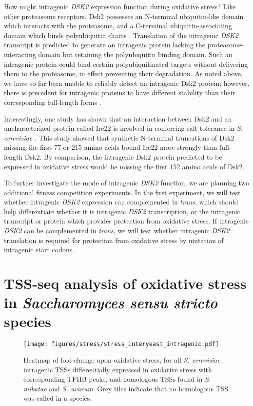 How might intragenic \textit{DSK2} expression function during oxidative stress?
Like other proteasome receptors, Dsk2 possesses an N-terminal ubiquitin-like domain which interacts with the proteasome, and a C-terminal ubiquitin-associating domain which binds polyubiquitin chains \citep{funakoshi2002}.
Translation of the intragenic \textit{DSK2} transcript is predicted to generate an intragenic protein lacking the proteasome-interacting domain but retaining the polyubiquitin binding domain.
Such an intragenic protein could bind certain polyubiquitinated targets without delivering them to the proteasome, in effect preventing their degradation.
As noted above, we have so far been unable to reliably detect an intragenic Dsk2 protein; however, there is precedent for intragenic proteins to have different stability than their corresponding full-length forms \citep{gammie1999, benanti2009}.

Interestingly, one study has shown that an interaction between Dsk2 and an uncharacterized protein called Irc22 is involved in conferring salt tolerance in \textit{S. cerevisiae} \citep{ishii2014}.
This study showed that synthetic N-terminal truncations of Dsk2 missing the first 77 or 215 amino acids bound Irc22 more strongly than full-length Dsk2.
By comparison, the intragenic Dsk2 protein predicted to be expressed in oxidative stress would be missing the first 152 amino acids of Dsk2.

To further investigate the mode of intragenic \textit{DSK2} function, we are planning two additional fitness competition experiments.
In the first experiment, we will test whether intragenic \textit{DSK2} expression can complemented in \textit{trans}, which should help differentiate whether it is intragenic \textit{DSK2} transcription, or the intragenic transcript or protein which provides protection from oxidative stress.
If intragenic \textit{DSK2} can be complemented in \textit{trans}, we will test whether intragenic \textit{DSK2} translation is required for protection from oxidative stress by mutation of intragenic start codons.

\section{TSS-seq analysis of oxidative stress in \textit{Saccharomyces sensu stricto} species}

\begin{figure}[h]
    \texttt{[image: figures/stress/stress\_interyeast\_intragenic.pdf]}
    \caption[Heatmap of fold-change upon oxidative stress, for \textit{S. cerevisiae} intragenic TSSs differentially expressed in oxidative stress, and homologous TSSs found in \textit{S. mikatae} and \textit{S. uvarum}.]{Heatmap of fold-change upon oxidative stress, for all \textit{S. cerevisiae} intragenic TSSs differentially expressed in oxidative stress with corresponding TFIIB peaks, and homologous TSSs found in \textit{S. mikatae} and \textit{S. uvarum}. Grey tiles indicate that no homologous TSS was called in a species.}
    \label{fig:stress_interyeast_intragenic}
\end{figure}

